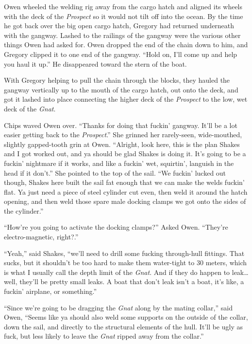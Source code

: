 \documentclass[]{scrbook}
\begin{document}
Owen wheeled the welding rig away from the cargo hatch and aligned its
wheels with the deck of the \emph{Prospect} so it would not tilt off
into the ocean. By the time he got back over the big open cargo hatch,
Gregory had returned underneath with the gangway. Lashed to the railings
of the gangway were the various other things Owen had asked for. Owen
dropped the end of the chain down to him, and Gregory clipped it to one
end of the gangway. ``Hold on, I'll come up and help you haul it up.''
He disappeared toward the stern of the boat.

With Gregory helping to pull the chain through the blocks, they hauled
the gangway vertically up to the mouth of the cargo hatch, out onto the
deck, and got it lashed into place connecting the higher deck of the
\emph{Prospect} to the low, wet deck of the \emph{Gnat}.

Chips waved Owen over. ``Thanks for doing that fuckin' gangway. It'll be
a lot easier getting back to the \emph{Prospect}.'' She grinned her
rarely-seen, wide-mouthed, slightly gapped-tooth grin at Owen.
``Alright, look here, this is the plan Shakes and I got worked out, and
ya should be glad Shakes is doing it. It's going to be a fuckin'
nightmare if it works, and like a fuckin' wet, squirtin', languish in
the head if it don't.'' She pointed to the top of the sail. ``We fuckin'
lucked out though, Shakes here built the sail fat enough that we can
make the welds fuckin' flat. Ya just need a piece of steel cylinder cut
even, then weld it around the hatch opening, and then weld those spare
male docking clamps we got onto the sides of the cylinder.''

``How're you going to activate the docking clamps?'' Asked Owen.
``They're electro-magnetic, right?.''

``Yeah,'' said Shakes, ``we'll need to drill some fucking through-hull
fittings. That sucks, but it shouldn't be too hard to make them
water-tight to 30 meters, which is what I usually call the depth limit
of the \emph{Gnat}. And if they do happen to leak\ldots{} well, they'll
be pretty small leaks. A boat that don't leak isn't a boat, it's like, a
fuckin' airplane, or something.''

``Since we're going to be dragging the \emph{Gnat} along by the mating
collar,'' said Owen, ``Seems like ya should also weld some supports on
the outside of the collar, down the sail, and directly to the structural
elements of the hull. It'll be ugly as fuck, but less likely to leave
the \emph{Gnat} ripped away from the collar.''
\end{document}
